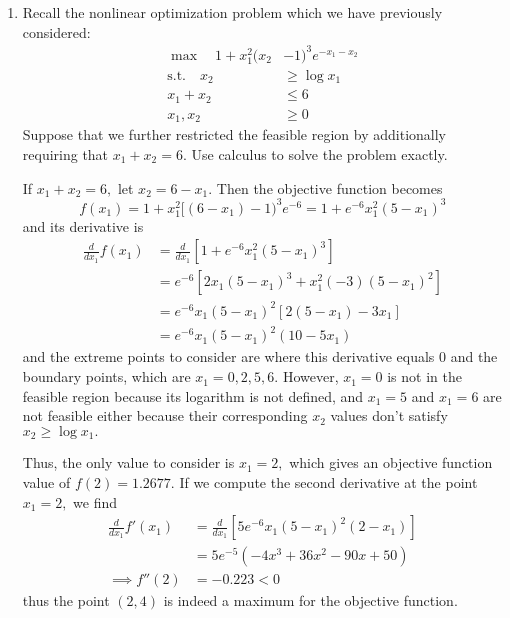\documentclass{article}
\begin{document}
\begin{enumerate}
\begin{soln}
		\end{soln}

		\newpage
	\item Recall the nonlinear optimization problem which we have previously considered: 
		\begin{align*}
			\max \quad 1+x_1^2(x_2&-1)^3e^{-x_1-x_2} \\
			\text{s.t.}\quad x_2&\ge\log x_1 \\
			x_1+x_2 &\le 6 \\
			x_1, x_2 &\ge 0
		\end{align*}
		Suppose that we further restricted the feasible region by additionally requiring that $x_1+x_2=6.$ Use calculus to solve the problem exactly.
		\begin{soln}
			If $x_1+x_2=6,$ let $x_2=6-x_1.$ Then the objective function becomes \[f(x_1)=1+x_1^2[(6-x_1)-1)^3e^{-6}=1+e^{-6}x_1^2(5-x_1)^3\] and its derivative is 
			\begin{align*}
				\frac{d}{dx_1}f(x_1) &= \frac{d}{dx_1}\left[ 1+e^{-6}x_1^2(5-x_1)^3 \right] \\
				&= e^{-6}\left[ 2x_1(5-x_1)^3 + x_1^2(-3)(5-x_1)^2 \right] \\
				&= e^{-6} x_1(5-x_1)^2 \left[ 2(5-x_1)-3x_1 \right] \\
				&= e^{-6}x_1(5-x_1)^2(10-5x_1)
			\end{align*} and the extreme points to consider are where this derivative equals 0 and the boundary points, which are $x_1=0, 2, 5, 6.$ However, $x_1=0$ is not in the feasible region because its logarithm is not defined, and $x_1=5$ and $x_1=6$ are not feasible either because their corresponding $x_2$ values don't satisfy $x_2\ge\log x_1.$ 
			
			Thus, the only value to consider is $x_1=2,$ which gives an objective function value of $f(2)=1.2677.$ If we compute the second derivative at the point $x_1=2,$ we find 
			\begin{align*}
				\frac{d}{dx_1}f'(x_1) &= \frac{d}{dx_1} \left[ 5e^{-6}x_1(5-x_1)^2(2-x_1) \right] \\
				&= 5e^{-5}\left( -4x^3+36x^2-90x+50 \right) \\
				\implies f''(2) &= -0.223 < 0
			\end{align*} thus the point $(2, 4)$ is indeed a maximum for the objective function.
			
		\end{soln}


\end{enumerate}
\end{document}
